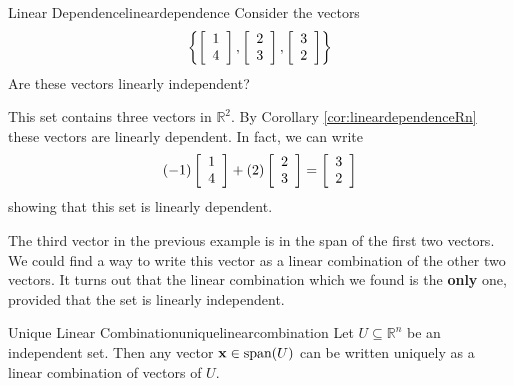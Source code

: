 \begin{example}{Linear Dependence}{lineardependence}
Consider the vectors 
\[
\left\{ \left[ \begin{array}{r}
1 \\
4 
\end{array}
\right], 
\left[ \begin{array}{r}
2 \\
3
\end{array}
\right], 
\left[ \begin{array}{r}
3 \\
2
\end{array}
\right] \right\}
\]
Are these vectors linearly independent?
\end{example}

\begin{solution}
This set contains three vectors in $\mathbb{R}^2$. By Corollary \ref{cor:lineardependenceRn} these vectors are linearly dependent.
In fact, we can write
\[
(-1) \left[ \begin{array}{r}
1 \\
4 
\end{array}
\right] + (2) 
\left[ \begin{array}{r}
2 \\
3
\end{array}
\right] = 
\left[ \begin{array}{r}
3 \\
2
\end{array}
\right]
\]
showing that this set is linearly dependent. 
\end{solution}

The third vector in the previous example is in the span of the first two vectors. We could find a way to write this vector as a linear combination of the other two vectors. It turns out that the linear combination which we found is the \textbf{only} one, provided that the set is linearly independent. 

\begin{theorem}{Unique Linear Combination}{uniquelinearcombination}
Let $U \subseteq\mathbb{R}^n$ be an independent set.
Then any vector ${\bf x}\in\mbox{span}(U)$ can be written uniquely as a linear combination of vectors of $U$.
\end{theorem}

